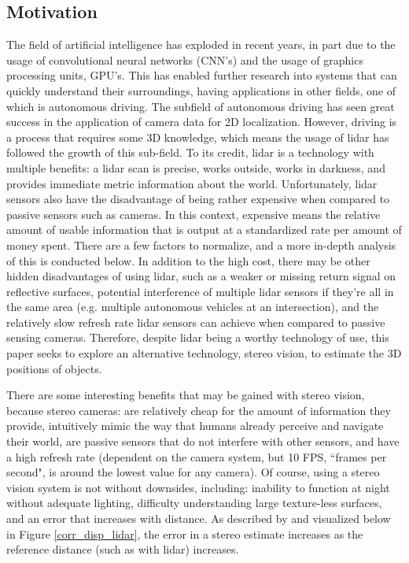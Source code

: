 \subsection{Motivation}
The field of artificial intelligence has exploded in recent years, in part due to the usage of convolutional neural networks (CNN's) and the usage of graphics processing units, GPU's. This has enabled further research into systems that can quickly understand their surroundings, having applications in other fields, one of which is autonomous driving. The subfield of autonomous driving has seen great success in the application of camera data for 2D localization. However, driving is a process that requires some 3D knowledge, which means the usage of lidar has followed the growth of this sub-field. To its credit, lidar is a technology with multiple benefits: a lidar scan is precise, works outside, works in darkness, and provides immediate metric information about the world. Unfortunately, lidar sensors also have the disadvantage of being rather expensive when compared to passive sensors such as cameras. In this context, expensive means the relative amount of usable information that is output at a standardized rate per amount of money spent. There are a few factors to normalize, and a more in-depth analysis of this is conducted below. In addition to the high cost, there may be other hidden disadvantages of using lidar, such as a weaker or missing return signal on reflective surfaces, potential interference of multiple lidar sensors if they're all in the same area (e.g. multiple autonomous vehicles at an intersection), and the relatively slow refresh rate lidar sensors can achieve when compared to passive sensing cameras. Therefore, despite lidar being a worthy technology of use, this paper seeks to explore an alternative technology, stereo vision, to estimate the 3D positions of objects.

There are some interesting benefits that may be gained with stereo vision, because stereo cameras: are relatively cheap for the amount of information they provide, intuitively mimic the way that humans already perceive and navigate their world, are passive sensors that do not interfere with other sensors, and have a high refresh rate (dependent on the camera system, but 10 FPS, ``frames per second", is around the lowest value for any camera). Of course, using a stereo vision system is not without downsides, including: inability to function at night without adequate lighting, difficulty understanding large texture-less surfaces, and an error that increases with distance. As described by \cite{wang_pseudo-lidar_2019} and visualized below in Figure \ref{corr_disp_lidar}, the error in a stereo estimate increases as the reference distance (such as with lidar) increases.

